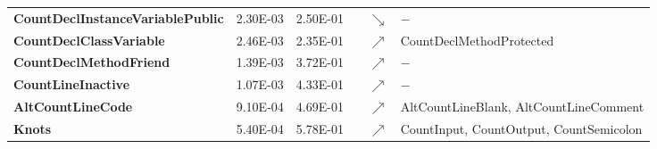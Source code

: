 \begin{table*}[t]
\begin{tabular}{|>{\bfseries}l|r|rl|c|l|}
CountDeclInstanceVariablePublic            & 2.30E-03 & 2.50E-01 &     & $\searrow$ &  $-$                                                                                                                                                                                                                                                                                                                                                                \\
CountDeclClassVariable                     & 2.46E-03 & 2.35E-01 &     & $\nearrow$ & CountDeclMethodProtected                                                                                                                                                                                                                                                                                                                                        \\
CountDeclMethodFriend                      & 1.39E-03 & 3.72E-01 &     & $\nearrow$ &     $-$                                                                                                                                                                                                                                                                                                                                                             \\
CountLineInactive                          & 1.07E-03 & 4.33E-01 &     & $\nearrow$ &    $-$                                                                                                                                                                                                                                                                                                                                                              \\
AltCountLineCode                           & 9.10E-04 & 4.69E-01 &     & $\nearrow$ & AltCountLineBlank, AltCountLineComment                                                                                                                                                                                                                                                                                                                          \\
Knots                                      & 5.40E-04 & 5.78E-01 &     & $\nearrow$ & CountInput, CountOutput, CountSemicolon                                                                                                                                                                                                                                                                                                                         \\

\end{tabular}
\end{table*}
